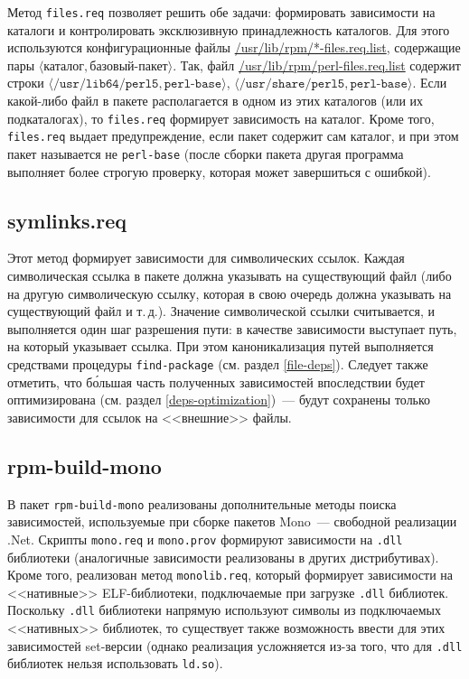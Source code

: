 \documentclass[russian,a4paper,12pt,titlepage]{article}
\begin{document}
Метод \verb|files.req| позволяет решить обе задачи: формировать зависимости на каталоги и контролировать
эксклюзивную принадлежность каталогов.  Для этого используются конфигурационные файлы \url{/usr/lib/rpm/*-files.req.list},
содержащие пары $\langle\textit{каталог},\textit{базовый-пакет}\rangle$.  Так, файл \url{/usr/lib/rpm/perl-files.req.list}
содержит строки
$\langle\texttt{/usr/lib64/perl5},\texttt{perl-base}\rangle$,
$\langle\texttt{/usr/share/perl5},\texttt{perl-base}\rangle$.
Если какой-либо файл в пакете располагается в одном из этих каталогов (или их подкаталогах),
то \verb|files.req| формирует зависимость на каталог.  Кроме того, \verb|files.req| выдает предупреждение,
если пакет содержит сам каталог, и при этом пакет называется не \verb|perl-base| (после сборки пакета
другая программа выполняет более строгую проверку, которая может завершиться с ошибкой).

\subsection{symlinks.req}
\label{symlinks-req}
Этот метод формирует зависимости для символических ссылок.  Каждая символическая ссылка в пакете
должна указывать на существующий файл (либо на другую символическую ссылку, которая в свою очередь
должна указывать на существующий файл и т.\,д.).  Значение символической ссылки считывается, и выполняется
один шаг разрешения пути: в качестве зависимости выступает путь, на который указывает ссылка.
При этом каноникализация путей выполняется средствами процедуры \verb|find-package| (см. раздел \ref{file-deps}).
Следует также отметить, что б\'{о}льшая часть полученных зависимостей впоследствии будет оптимизирована
(см. раздел \ref{deps-optimization})~--- будут сохранены только зависимости для ссылок на <<внешние>> файлы.

\subsection{rpm-build-mono}
\label{rpm-build-mono}
В пакет \verb|rpm-build-mono| реализованы дополнительные методы поиска зависимостей, используемые
при сборке пакетов Mono~--- свободной реализации .Net.  Скрипты \verb|mono.req| и \verb|mono.prov|
формируют зависимости на \verb|.dll| библиотеки (аналогичные зависимости реализованы в других дистрибутивах).
Кроме того, реализован метод \verb|monolib.req|, который формирует зависимости на <<нативные>> ELF-библиотеки,
подключаемые при загрузке \verb|.dll| библиотек.  Поскольку \verb|.dll| библиотеки напрямую используют
символы из подключаемых <<нативных>> библиотек, то существует также возможность ввести для этих зависимостей
set-версии (однако реализация усложняется из-за того, что для \verb|.dll| библиотек нельзя использовать
\verb|ld.so|).
\end{document}
